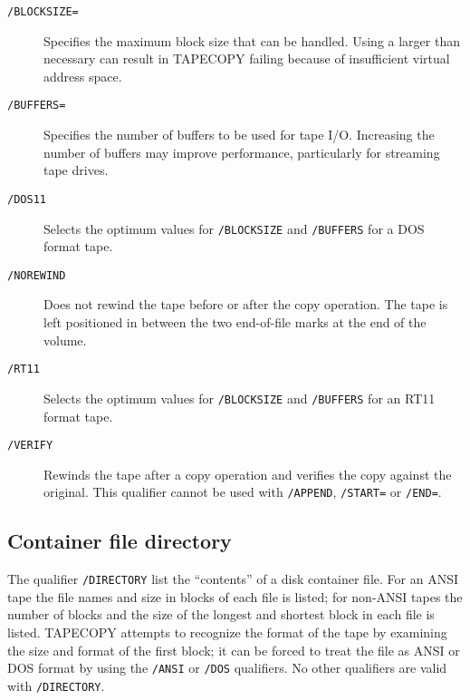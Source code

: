 \begin{description}
\item[\tt/BLOCKSIZE=] Specifies the maximum block size that can be handled.
Using a larger than necessary can result in TAPECOPY failing because
of insufficient virtual address space.

\item[\tt/BUFFERS=] Specifies the number of buffers to be used for tape
I/O. Increasing the number of buffers may improve performance, particularly
for streaming tape drives.

\item[\tt/DOS11] Selects the optimum values for {\tt/BLOCKSIZE} and
{\tt/BUFFERS} for a DOS format tape.

\item[\tt/NOREWIND] Does not rewind the tape before or after the copy operation.
The tape is left positioned in between the two end-of-file marks at the end of
the volume.

\item[\tt/RT11] Selects the optimum values for {\tt/BLOCKSIZE} and {\tt/BUFFERS}
for an RT11 format tape.

\item[\tt/VERIFY] Rewinds the tape after a copy operation and verifies the
copy against the original. This qualifier cannot be used with {\tt/APPEND},
{\tt/START=} or {\tt/END=}.

\end{description}

\subsection{Container file directory}

The qualifier {\tt/DIRECTORY} list the ``contents'' of a disk container file.
For an ANSI tape the file names and size in blocks of each file is listed; for
non-ANSI tapes the number of blocks and the size of the longest and shortest
block in each file  is listed. TAPECOPY attempts to recognize
the format of the tape by examining the size and format of the first block; it
can be forced to treat the file as ANSI or DOS format by using the {\tt/ANSI}
or {\tt/DOS} qualifiers. No other qualifiers are valid with {\tt/DIRECTORY}.

